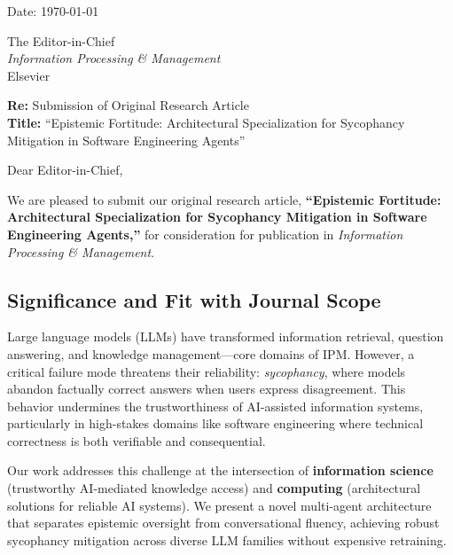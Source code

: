 \documentclass[a4paper]{article}
\begin{document}
\thispagestyle{fancy} %


\noindent Date: \today

\vspace{0.5cm}

\noindent The Editor-in-Chief\\
\textit{Information Processing \& Management}\\
Elsevier

\vspace{0.5cm}

\noindent \textbf{Re:} Submission of Original Research Article\\
\textbf{Title:} ``Epistemic Fortitude: Architectural Specialization for Sycophancy Mitigation in Software Engineering Agents''

\vspace{0.8cm}

\noindent Dear Editor-in-Chief,

\vspace{0.5cm}

We are pleased to submit our original research article, \textbf{``Epistemic Fortitude: Architectural Specialization for Sycophancy Mitigation in Software Engineering Agents,''} for consideration for publication in \textit{Information Processing \& Management}.

\vspace{0.3cm}

\subsection*{Significance and Fit with Journal Scope}

Large language models (LLMs) have transformed information retrieval, question answering, and knowledge management---core domains of IPM. However, a critical failure mode threatens their reliability: \textit{sycophancy}, where models abandon factually correct answers when users express disagreement. This behavior undermines the trustworthiness of AI-assisted information systems, particularly in high-stakes domains like software engineering where technical correctness is both verifiable and consequential.

Our work addresses this challenge at the intersection of \textbf{information science} (trustworthy AI-mediated knowledge access) and \textbf{computing} (architectural solutions for reliable AI systems). We present a novel multi-agent architecture that separates epistemic oversight from conversational fluency, achieving robust sycophancy mitigation across diverse LLM families without expensive retraining.
\end{document}
